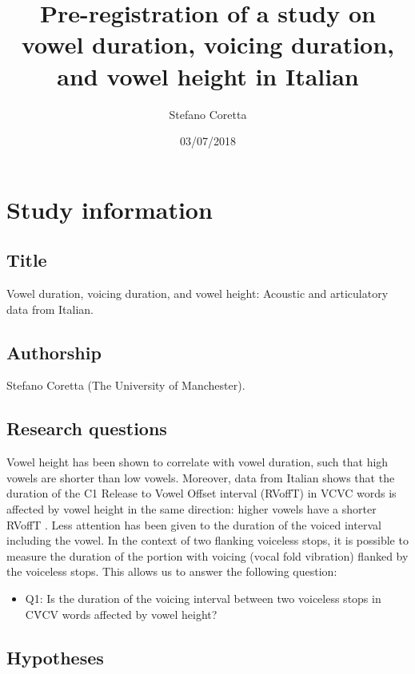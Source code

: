 \documentclass[11pt,]{article}
\title{Pre-registration of a study on vowel duration, voicing duration, and
vowel height in Italian}
\author{Stefano Coretta}
\date{03/07/2018}
\providecommand{\tightlist}{%
  \setlength{\itemsep}{0pt}\setlength{\parskip}{0pt}}
\begin{document}
\maketitle

\hypertarget{study-information}{%
\section{Study information}\label{study-information}}

\hypertarget{title}{%
\subsection{Title}\label{title}}

Vowel duration, voicing duration, and vowel height: Acoustic and
articulatory data from Italian.

\hypertarget{authorship}{%
\subsection{Authorship}\label{authorship}}

Stefano Coretta (The University of Manchester).

\hypertarget{research-questions}{%
\subsection{Research questions}\label{research-questions}}

Vowel height has been shown to correlate with vowel duration, such that
high vowels are shorter than low vowels. Moreover, data from Italian
shows that the duration of the C1 Release to Vowel Offset interval
(RVoffT) in VCVC words is affected by vowel height in the same
direction: higher vowels have a shorter RVoffT \citep{esposito2002}.
Less attention has been given to the duration of the voiced interval
including the vowel. In the context of two flanking voiceless stops, it
is possible to measure the duration of the portion with voicing (vocal
fold vibration) flanked by the voiceless stops. This allows us to answer
the following question:

\begin{itemize}
\tightlist
\item
  Q1: Is the duration of the voicing interval between two voiceless
  stops in CV́CV words affected by vowel height?
\end{itemize}

\hypertarget{hypotheses}{%
\subsection{Hypotheses}\label{hypotheses}}
\end{document}
